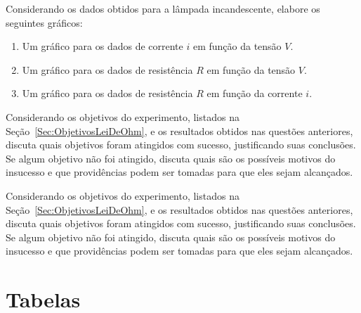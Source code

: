 \begin{question}[type={exam}]{2}
Considerando os dados obtidos para a lâmpada incandescente, elabore os seguintes gráficos:
\begin{enumerate}[label=\roman*.]
\item Um gráfico para os dados de corrente $i$ em função da tensão $V$.
\item Um gráfico para os dados de resistência $R$ em função da tensão $V$.
\item Um gráfico para os dados de resistência $R$ em função da corrente $i$.
\end{enumerate}
\end{question}

\begin{question}[type={exam}]{2}
Considerando os objetivos do experimento, listados na Seção~\ref{Sec:ObjetivosLeiDeOhm}, e os resultados obtidos nas questões anteriores, discuta quais objetivos foram atingidos com sucesso, justificando suas conclusões. Se algum objetivo não foi atingido, discuta quais são os possíveis motivos do insucesso e que providências podem ser tomadas para que eles sejam alcançados.
\end{question}

\begin{question}[type={exam}]{2}
Considerando os objetivos do experimento, listados na Seção~\ref{Sec:ObjetivosLeiDeOhm}, e os resultados obtidos nas questões anteriores, discuta quais objetivos foram atingidos com sucesso, justificando suas conclusões. Se algum objetivo não foi atingido, discuta quais são os possíveis motivos do insucesso e que providências podem ser tomadas para que eles sejam alcançados.
\end{question}

\vfill
\pagebreak
\section{Tabelas}

